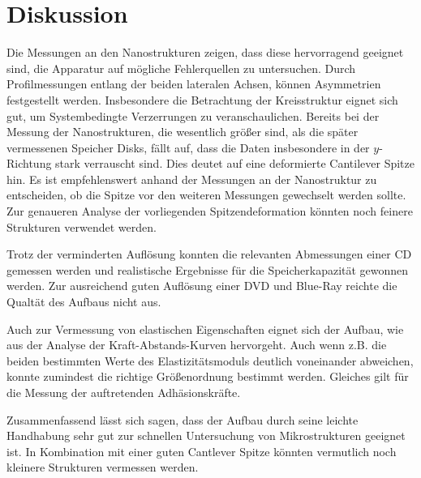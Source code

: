 \newpage
\section{Diskussion}
Die Messungen an den Nanostrukturen zeigen, dass diese hervorragend geeignet sind, die Apparatur auf
mögliche Fehlerquellen zu untersuchen. Durch Profilmessungen entlang der beiden lateralen Achsen,
können Asymmetrien festgestellt werden. Insbesondere die Betrachtung der Kreisstruktur eignet sich
gut, um Systembedingte Verzerrungen zu veranschaulichen. Bereits bei der Messung der Nanostrukturen,
die wesentlich größer sind, als die später vermessenen Speicher Disks, fällt auf, dass die
Daten insbesondere in der $y$-Richtung stark verrauscht sind. Dies deutet auf eine deformierte
Cantilever Spitze hin. Es ist empfehlenswert anhand der Messungen an der Nanostruktur zu entscheiden,
ob die Spitze vor den weiteren Messungen gewechselt werden sollte. Zur genaueren Analyse der vorliegenden
Spitzendeformation könnten noch feinere Strukturen verwendet werden.

Trotz der verminderten Auflösung konnten die relevanten Abmessungen einer CD gemessen werden und realistische
Ergebnisse für die Speicherkapazität gewonnen werden. Zur ausreichend guten Auflösung einer
DVD und Blue-Ray reichte die Qualtät des Aufbaus nicht aus.

Auch zur Vermessung von elastischen Eigenschaften eignet sich der Aufbau, wie aus der Analyse der
Kraft-Abstands-Kurven hervorgeht. Auch wenn z.B. die beiden bestimmten Werte des Elastizitätsmoduls
deutlich voneinander abweichen, konnte zumindest die richtige Größenordnung bestimmt werden. Gleiches gilt
für die Messung der auftretenden Adhäsionskräfte.

Zusammenfassend lässt sich sagen, dass der Aufbau durch seine leichte Handhabung sehr gut zur schnellen
Untersuchung von Mikrostrukturen geeignet ist. In Kombination
mit einer guten Cantlever Spitze könnten vermutlich noch kleinere Strukturen vermessen werden.
